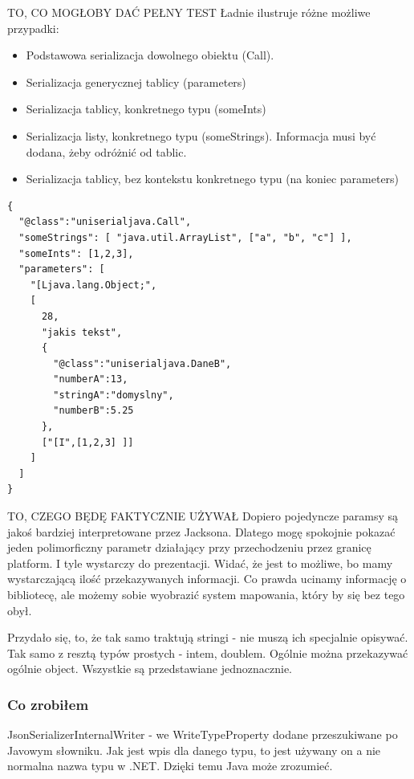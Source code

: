 TO, CO MOGŁOBY DAĆ PEŁNY TEST
Ładnie ilustruje różne możliwe przypadki:
\begin{itemize}
	\item Podstawowa serializacja dowolnego obiektu (Call).
	\item Serializacja generycznej tablicy (parameters)
	\item Serializacja tablicy, konkretnego typu (someInts)
	\item Serializacja listy, konkretnego typu (someStrings). Informacja musi być dodana, żeby odróżnić od tablic.
	\item Serializacja tablicy, bez kontekstu konkretnego typu (na koniec parameters)
\end{itemize}

\begin{lstlisting}[float, frame=single, caption={Jackson daje. Faktyczny test wywołania.}, label=kod:jackson-call-serilization]
{
  "@class":"uniserialjava.Call",
  "someStrings": [ "java.util.ArrayList", ["a", "b", "c"] ],
  "someInts": [1,2,3],
  "parameters": [
    "[Ljava.lang.Object;",
    [
      28,
      "jakis tekst",
      {
        "@class":"uniserialjava.DaneB",
        "numberA":13,
        "stringA":"domyslny",
        "numberB":5.25
      },
      ["[I",[1,2,3] ]]
    ]
  ]
}
\end{lstlisting}

TO, CZEGO BĘDĘ FAKTYCZNIE UŻYWAŁ
Dopiero pojedyncze paramsy są jakoś bardziej interpretowane przez Jacksona. Dlatego mogę spokojnie pokazać jeden polimorficzny parametr działający przy przechodzeniu przez granicę platform. I tyle wystarczy do prezentacji. Widać, że jest to możliwe, bo mamy wystarczającą ilość przekazywanych informacji. Co prawda ucinamy informację o bibliotecę, ale możemy sobie wyobrazić system mapowania, który by się bez tego obył.

Przydało się, to, że tak samo traktują stringi - nie muszą ich specjalnie opisywać. Tak samo z resztą typów prostych - intem, doublem. Ogólnie można przekazywać ogólnie object. Wszystkie są przedstawiane jednoznacznie.

\subsubsection{Co zrobiłem}
JsonSerializerInternalWriter - we WriteTypeProperty dodane przeszukiwane po Javowym słowniku. Jak jest wpis dla danego typu, to jest używany on a nie normalna nazwa typu w .NET. Dzięki temu Java może zrozumieć.

